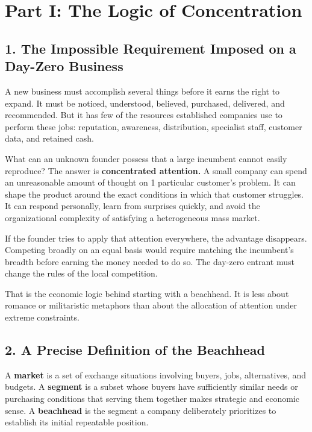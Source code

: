 \section*{Part I: The Logic of Concentration}

\subsection*{1. The Impossible Requirement Imposed on a Day-Zero Business}

A new business must accomplish several things before it earns the right to expand. It must be noticed, understood, believed, purchased, delivered, and recommended. But it has few of the resources established companies use to perform these jobs: reputation, awareness, distribution, specialist staff, customer data, and retained cash.

What can an unknown founder possess that a large incumbent cannot easily reproduce? The answer is \textbf{concentrated attention.} A small company can spend an unreasonable amount of thought on 1 particular customer's problem. It can shape the product around the exact conditions in which that customer struggles. It can respond personally, learn from surprises quickly, and avoid the organizational complexity of satisfying a heterogeneous mass market.

If the founder tries to apply that attention everywhere, the advantage disappears. Competing broadly on an equal basis would require matching the incumbent's breadth before earning the money needed to do so. The day-zero entrant must change the rules of the local competition.

That is the economic logic behind starting with a beachhead. It is less about romance or militaristic metaphors than about the allocation of attention under extreme constraints.

\subsection*{2. A Precise Definition of the Beachhead}

A \textbf{market} is a set of exchange situations involving buyers, jobs, alternatives, and budgets. A \textbf{segment} is a subset whose buyers have sufficiently similar needs or purchasing conditions that serving them together makes strategic and economic sense. A \textbf{beachhead} is the segment a company deliberately prioritizes to establish its initial repeatable position.

